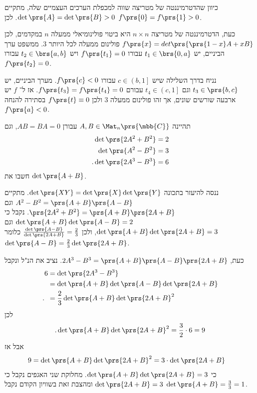 \documentclass[a4paper,10pt,twoside,openany]{book}
\begin{document}
\begin{solution}
כיוון שהדטרמיננטה של מטריצה שווה למכפלת הערכים העצמיים שלה, מתקיים
$\det\prs{A} = \det\prs{B} > 0$.
לכן
$f\prs{0} = f\prs{1} > 0$.

כעת, הדטרמיננטה של מטריצה
$n \times n$
היא ביטוי פולינומיאלי ממעלה
$n$
במקדמים, לכן
$f\prs{x} = det\prs{\prs{1-x} A + xB}$
פולינום ממעלה לכל היותר
$3$.
ממשפט ערך הביניים, יש
$t_1 \in \brs{0,a}$
עבורו
$f\prs{t_1} = 0$
ויש
$t_2 \in \brs{a,b}$
עבורו
$f\prs{t_2} = 0$.

נניח בדרך השלילה שיש
$c \in \left(b, 1 \right]$
עבורו
$f\prs{c} < 0$.
מערך הביניים, יש
$t_3 \in \prs{b,c}$
וגם
$t_4 \in \left(c, 1\right]$
עבורם
$f\prs{t_3} = f\prs{t_4} = 0$.
אז ל־%
$f$
יש ארבעה שורשים שונים, אך זהו פולינום ממעלה
$3$
ולכן
$f\prs{t} \equiv 0$
בסתירה להנחה
$f\prs{a} < 0$.
\end{solution}

\begin{exercisechap}
תהיינה
$A,B \in \Mat_n\prs{\mbb{C}}$
עבורן
$AB = BA = 0$,
וגם
\begin{align*}
\det\prs{2 A^2 + B^2} &= 2 \\
\det\prs{A^2 - B^2} &= 3 \\
\text{.} \det\prs{2A^3 -B^3} &= 6
\end{align*}
חשבו את
$\det\prs{A+B}$.
\end{exercisechap}

\begin{solution}
ננסה להיעזר בתכונה
$\det\prs{XY} = \det\prs{X} \det\prs{Y}$.
מתקיים
$A^2 - B^2 = \prs{A+B}\prs{A-B}$
וגם
$\prs{2A^2 + B^2} = \prs{A+B}\prs{2A+B}$.
נקבל כי
$\det\prs{A+B}\det\prs{A-B} = 2$
וגם
$\det\prs{A+B}\det\prs{2A+B} = 3$,
ולכן
$\frac{\det\prs{A-B}}{\det\prs{2A+B}} = \frac{2}{3}$
כלומר
$\det\prs{A-B} = \frac{2}{3} \det\prs{2A+B}$.

כעת,
$2A^3 -B^3 = \prs{A+B}\prs{A-B}\prs{2A+B}$.
נציב את הנ"ל ונקבל
\begin{align*}
6 &= \det\prs{2A^3 - B^3}
\\&= \det\prs{A+B} \det\prs{A-B} \det\prs{2A+B}
\\ \text{.} \hphantom{6} &= \frac{2}{3} \det\prs{A+B} \det\prs{2A+B}^2
\end{align*}
לכן
\[\text{.} \det\prs{A+B} \det\prs{2A+B}^2 = \frac{3}{2} \cdot 6 = 9\]
אבל אז
\begin{align*}
9 &= \det\prs{A+B} \det\prs{2A+B}^2 = 3 \cdot \det\prs{2A+B}
\end{align*}
כי
$\det\prs{A+B}\det\prs{2A+B} = 3$.
מחלוקת שני האגפים נקבל כי
$\det\prs{2A+B} = 3$
ומהצבת זאת בשוויון הקודם נקבל
$\det\prs{A+B} = \frac{3}{3} = 1$.
\end{solution}
\end{document}
